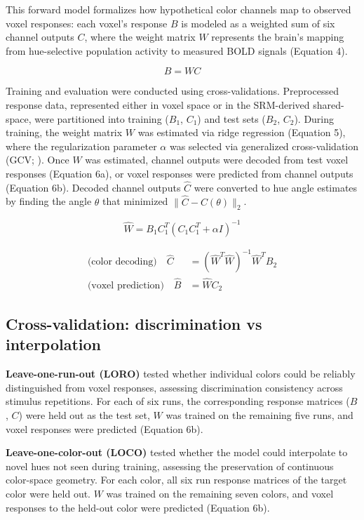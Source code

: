 This forward model formalizes how hypothetical color channels map to observed voxel responses: each voxel's response $B$ is modeled as a weighted sum of six channel outputs $C$, where the weight matrix $W$ represents the brain's mapping from hue-selective population activity to measured BOLD signals (Equation 4).

\begin{equation}
B = W C
\end{equation}

Training and evaluation were conducted using cross-validations. Preprocessed response data, represented either in voxel space or in the SRM-derived shared-space, were partitioned into training ($B_1$, $C_1$) and test sets ($B_2$, $C_2$). During training, the weight matrix $W$ was estimated via ridge regression (Equation 5), where the regularization parameter $\alpha$ was selected via generalized cross-validation (GCV; ). Once $W$ was estimated, channel outputs were decoded from test voxel responses (Equation 6a), or voxel responses were predicted from channel outputs (Equation 6b). Decoded channel outputs $\hat{C}$ were converted to hue angle estimates by finding the angle $\theta$ that minimized $\|\hat{C} - C(\theta)\|_2$.

\begin{equation}
\hat{W} = B_1 C_1^T (C_1 C_1^T + \alpha I)^{-1}
\end{equation}

\begin{align}
\text{(color decoding)} \quad \hat{C} &= (\hat{W}^T \hat{W})^{-1} \hat{W}^T B_2 \\
\text{(voxel prediction)} \quad \hat{B} &= \hat{W} C_2
\end{align}

\subsection*{Cross-validation: discrimination vs interpolation}

\textbf{Leave-one-run-out (LORO)} tested whether individual colors could be reliably distinguished from voxel responses, assessing discrimination consistency across stimulus repetitions. For each of six runs, the corresponding response matrices ($B$, $C$) were held out as the test set, $W$ was trained on the remaining five runs, and voxel responses were predicted (Equation 6b).

\textbf{Leave-one-color-out (LOCO)} tested whether the model could interpolate to novel hues not seen during training, assessing the preservation of continuous color-space geometry. For each color, all six run response matrices of the target color were held out. $W$ was trained on the remaining seven colors, and voxel responses to the held-out color were predicted (Equation 6b).

